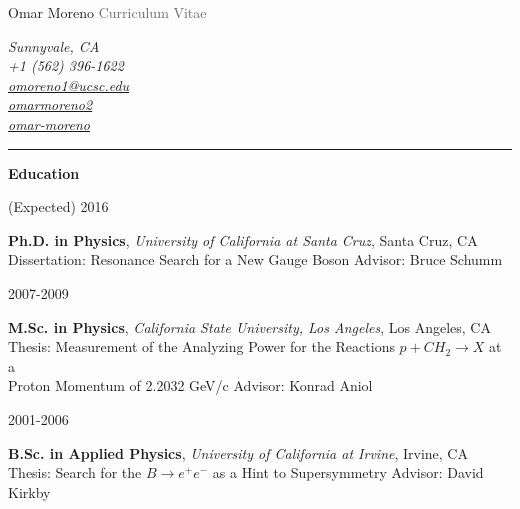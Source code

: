 \documentclass[11pt]{article}
\newcommand{\cvsection}[1] {
    \noindent
    \textcolor{indigodye}{\rule{.15\textwidth}{.1in} \hspace{0.01 \textwidth} \textbf{\Large{#1}}} \newline 
}
\newcommand{\educationentry}[6] { 
    \noindent
    \begin{minipage}[t]{0.15\textwidth} \begin{flushright} #1 \end{flushright} \end{minipage} \hspace{0.01\textwidth}
    \begin{minipage}[t]{0.84\textwidth} 
        \textbf{#2}, \emph{#3}, #4 \newline 
        #5 \newline
        Advisor: #6 \newline 
    \end{minipage}
}
\begin{document}
    
    \noindent
    \begin{minipage}[c]{0.5\textwidth}
        \begin{flushleft}
            \Huge{Omar Moreno} \newline
            \Large{\textcolor{dimgray}{Curriculum Vitae}}
        \end{flushleft}
    \end{minipage}
    \begin{minipage}[c]{0.50\textwidth}
        \begin{flushright}
            \color{dimgray} \em
            Sunnyvale, CA           \\
            \faMobilePhone \hspace{1pt} +1 (562) 396-1622       \\
            \faEnvelope \hspace{1pt} \href{mailto:omoreno1@ucsc.edu}{omoreno1@ucsc.edu}          \\
            \faLinkedin \hspace{1pt} \href{https://www.linkedin.com/in/omarmoreno2}{omarmoreno2} \\
            \faGithub \hspace{1pt} \href{https://github.com/omar-moreno}{omar-moreno}            \\
        \end{flushright}
    \end{minipage}

    \cvsection{Education}
        \educationentry{(Expected) 2016}
                       {Ph.D. in Physics}
                       {University of California at Santa Cruz}
                       {Santa Cruz, CA}
                       {Dissertation: Resonance Search for a New Gauge Boson}
                       {Bruce Schumm}
        \educationentry{2007-2009}
                       {M.Sc. in Physics}
                       {California State University, Los Angeles}
                       {Los Angeles, CA}
                       {Thesis: Measurement of the Analyzing Power for the Reactions $p + CH_{2}
                       \rightarrow X$ at a \\ Proton Momentum of 2.2032 GeV/c}
                       {Konrad Aniol} 
        \educationentry{2001-2006}
                       {B.Sc. in Applied Physics}
                       {University of California at Irvine}
                       {Irvine, CA}
                       {Thesis: Search for the $B\rightarrow e^+e^-$ as a Hint to Supersymmetry}
                       {David Kirkby}
\end{document}
